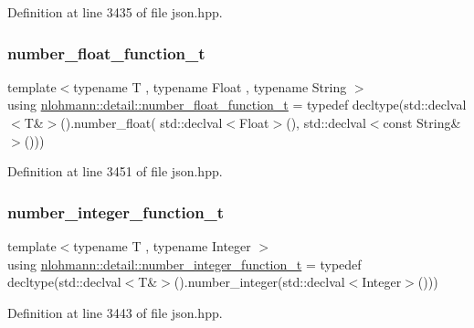 Definition at line 3435 of file json.\+hpp.

\mbox{\label{namespacenlohmann_1_1detail_ad42df56e913abe26ed556e0e92f386f4}} 
\subsubsection{\texorpdfstring{number\_float\_function\_t}{number\_float\_function\_t}}
{\footnotesize\ttfamily template$<$typename T , typename Float , typename String $>$ \\
using \mbox{\hyperlink{namespacenlohmann_1_1detail_ad42df56e913abe26ed556e0e92f386f4}{nlohmann\+::detail\+::number\+\_\+float\+\_\+function\+\_\+t}} = typedef decltype(std\+::declval$<$T\&$>$().number\+\_\+float( std\+::declval$<$Float$>$(), std\+::declval$<$const String\&$>$()))}



Definition at line 3451 of file json.\+hpp.

\mbox{\label{namespacenlohmann_1_1detail_a4a3e14a011b9ea1ff849fc6d2411e6a0}} 
\subsubsection{\texorpdfstring{number\_integer\_function\_t}{number\_integer\_function\_t}}
{\footnotesize\ttfamily template$<$typename T , typename Integer $>$ \\
using \mbox{\hyperlink{namespacenlohmann_1_1detail_a4a3e14a011b9ea1ff849fc6d2411e6a0}{nlohmann\+::detail\+::number\+\_\+integer\+\_\+function\+\_\+t}} = typedef decltype(std\+::declval$<$T\&$>$().number\+\_\+integer(std\+::declval$<$Integer$>$()))}



Definition at line 3443 of file json.\+hpp.

\mbox{\label{namespacenlohmann_1_1detail_a74da7b17bda76f65d276feb18209c913}} 
